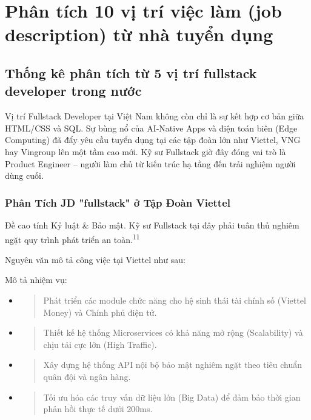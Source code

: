\documentclass[12pt,a4paper]{article}
\begin{document}
\section{Phân tích 10 vị trí việc làm (job description) từ nhà tuyển dụng}
\subsection{Thống kê phân tích từ 5 vị trí fullstack developer trong nước}

Vị trí Fullstack Developer tại Việt Nam không còn chỉ là sự kết hợp cơ bản giữa HTML/CSS và SQL. Sự bùng nổ của AI-Native Apps và điện toán biên (Edge Computing) đã đẩy yêu cầu tuyển dụng tại các tập đoàn lớn như Viettel, VNG hay Vingroup lên một tầm cao mới. Kỹ sư Fullstack giờ đây đóng vai trò là Product Engineer – người làm chủ từ kiến trúc hạ tầng đến trải nghiệm người dùng cuối.

\subsubsection{Phân Tích JD "fullstack" ở Tập Đoàn Viettel}

Đề cao tính Kỷ luật \& Bảo mật. Kỹ sư Fullstack tại đây phải tuân thủ nghiêm ngặt quy trình phát triển an toàn.\textsuperscript{11}

Nguyên văn mô tả công việc tại Viettel như sau:

Mô tả nhiệm vụ:
\begin{itemize}
\item
  \begin{quote}
  Phát triển các module chức năng cho hệ sinh thái tài chính số (Viettel Money) và Chính phủ điện tử.
  \end{quote}
\item
  \begin{quote}
  Thiết kế hệ thống Microservices có khả năng mở rộng (Scalability) và chịu tải cực lớn (High Traffic).
  \end{quote}
\item
  \begin{quote}
  Xây dựng hệ thống API nội bộ bảo mật nghiêm ngặt theo tiêu chuẩn quân đội và ngân hàng.
  \end{quote}
\item
  \begin{quote}
  Tối ưu hóa các truy vấn dữ liệu lớn (Big Data) để đảm bảo thời gian phản hồi thực tế dưới 200ms.
  \end{quote}
\end{itemize}
\end{document}
